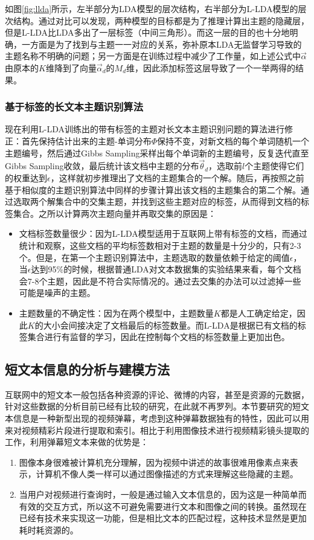 如图\ref{fig:llda}所示，左半部分为LDA模型的层次结构，右半部分为L-LDA模型的层次结构。通过对比可以发现，两种模型的目标都是为了推理计算出主题的隐藏层，但是L-LDA比LDA多出了一层标签（中间三角形）。而这一层的目的也十分地明确，一方面是为了找到与主题一一对应的关系，弥补原本LDA无监督学习导致的主题名称不明确的问题；另一方面是在训练过程中减少了工作量，如上述公式中$\vec{\alpha}$由原本的$K$维降到了向量$\vec{\alpha}_d$的$M_d$维，因此添加标签这层导致了一个一举两得的结果。

\subsubsection{基于标签的长文本主题识别算法}
现在利用L-LDA训练出的带有标签的主题对长文本主题识别问题的算法进行修正：首先保持估计出来的主题-单词分布$\Phi$保持不变，对新文档的每个单词随机一个主题编号，然后通过Gibbs Sampling采样出每个单词新的主题编号，反复迭代直至Gibbs Sampling收敛，最后统计该文档中主题的分布$\vec{\theta}_d$，选取前$l$个主题使得它们的权重达到$\epsilon$，这样就初步推理出了文档的主题集合的一个解。随后，再按照之前基于相似度的主题识别算法中同样的步骤计算出该文档的主题集合的第二个解。通过选取两个解集合中的交集主题，并找到这些主题对应的标签，从而得到文档的标签集合。之所以计算两次主题向量并再取交集的原因是：
\begin{itemize}
  \item 文档标签数量很少：因为L-LDA模型适用于互联网上带有标签的文档，而通过统计和观察，这些文档的平均标签数相对于主题的数量是十分少的，只有2-3个。但是，在第一个主题识别算法中，主题选取的数量依赖于给定的阈值$\epsilon$，当$\epsilon$达到95\%的时候，根据普通LDA对文本数据集的实验结果来看，每个文档会7-8个主题，因此是不符合实际情况的。通过去交集的办法可以过滤掉一些可能是噪声的主题。
  \item 主题数量的不确定性：因为在两个模型中，主题数量$K$都是人工确定给定，因此$K$的大小会间接决定了文档最后的标签数量。而L-LDA是根据已有文档的标签集合进行有监督的学习，因此在控制每个文档的标签数量上更加出色。
\end{itemize}

\subsection{短文本信息的分析与建模方法}
互联网中的短文本一般包括各种资源的评论、微博的内容，甚至是资源的元数据，针对这些数据的分析目前已经有比较的研究，在此就不再罗列。本节要研究的短文本信息是一种新型出现的视频弹幕，考虑到这种弹幕数据独有的特性，因此可以用来对视频精彩片段进行提取和索引。相比于利用图像技术进行视频精彩镜头提取的工作，利用弹幕短文本来做的优势是：
\begin{enumerate}
  \item 图像本身很难被计算机充分理解，因为视频中讲述的故事很难用像素点来表示，计算机不像人类一样可以通过图像描述的方式来理解这些隐藏的主题。
  \item 当用户对视频进行查询时，一般是通过输入文本信息的，因为这是一种简单而有效的交互方式，所以这不可避免需要进行文本和图像之间的转换。虽然现在已经有技术来实现这一功能，但是相比文本的匹配过程，这种技术显然是更加耗时耗资源的。
\end{enumerate}

